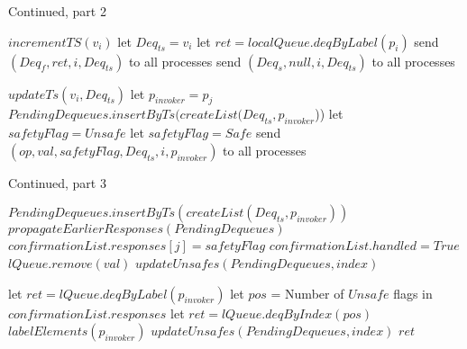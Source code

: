 \documentclass[a4paper,USenglish]{lipics-v2021} %
\begin{document}
\begin{algorithm}
  \caption{Continued, part 2}
  \begin{algorithmic}[1]
      \State $incrementTS(v_i)$
      \State let $Deq_{ts} = v_i$
        \State let $ret = localQueue.deqByLabel(p_i)$
        \State send $(Deq_f, ret, i, Deq_{ts})$ to all processes
      \Else
        \State send $(Deq_s, null, i, Deq_{ts})$ to all processes
      \EndIf
    \EndFunction

      \State $updateTs(v_i, Deq_{ts})$
      \State let $p_{invoker} = p_j$
      \State $PendingDequeues.insertByTs(createList(Deq_{ts}, p_{invoker}$))
      \EndIf
        \State let $safetyFlag = Unsafe$
      \Else
        \State let $safetyFlag = Safe$
      \EndIf
      \State send $(op, val, safetyFlag, Deq_{ts}, i, p_{invoker})$ to all processes
    \EndFunction

  \end{algorithmic}
\end{algorithm}

\begin{algorithm}
  \caption{Continued, part 3}
  \begin{algorithmic}[1]
        \State $PendingDequeues.insertByTs(createList(Deq_{ts}, p_{invoker}))$
      \EndIf
      \State $propagateEarlierResponses(PendingDequeues)$ 
          \State $confirmationList.responses[j] = safetyFlag$
        \EndIf 
          \State $confirmationList.handled = True$ 
            \State $lQueue.remove(val)$
          \EndIf 
          \State $updateUnsafes(PendingDequeues, index)$
            \State \Return
          \EndIf

          \State let $ret = lQueue.deqByLabel(p_{invoker})$
          \Else 
            \State let $pos$ = Number of $Unsafe$ flags in $confirmationList.responses$
            \State let $ret = lQueue.deqByIndex(pos)$
          \EndIf
          \State $labelElements(p_{invoker})$
          \State $updateUnsafes(PendingDequeues, \textit{index})$
            \State \Return $ret$
          \EndIf
        \EndIf 
      \EndFor
    \EndFunction
  \end{algorithmic}
\end{algorithm}
\end{document}
